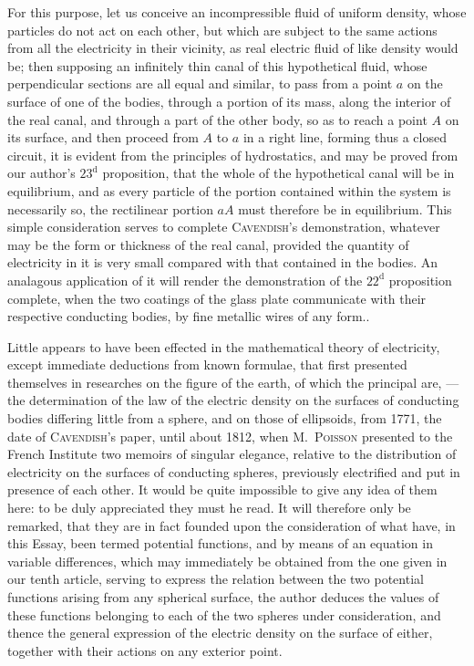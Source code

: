 \documentclass[12pt,notitlepage]{amsart}
\let\Person\textsc
\begin{document}
{For this purpose, let us conceive an incompressible
fluid of uniform density, whose
particles do not act on each other,
but which are subject to the same actions from all
the electricity in their vicinity, as real electric
fluid of like density would be; then supposing an
infinitely thin canal of this hypothetical fluid,
whose perpendicular sections are
all equal and similar, to pass from a point $a$
on the surface of one of the bodies, through
a portion of its mass, along the interior of the real canal,
and through a part of the
other body, so as to reach a point $A$ on its surface,
and then proceed from $A$ to $a$ in
a right line, forming thus a closed circuit,
it is evident from the principles of hydrostatics,
and may be proved from our author's $23^\text{d}$ proposition,
that the whole of the
hypothetical canal will be in equilibrium,
and as every particle of the portion contained
within the system is necessarily so,
the rectilinear portion $aA$ must therefore be in equilibrium.
This simple consideration serves to complete
\Person{Cavendish}'s demonstration,
whatever may be the form or thickness of the real canal,
provided the quantity of electricity
in it is very small compared with that contained in the bodies.
An analagous application
of it will render the demonstration of the $22^\text{d}$
proposition complete, when the two coatings
of the glass plate communicate with their respective conducting bodies,
by fine metallic wires of any form.}.

Little appears to have been effected in the mathematical theory of electricity,
except immediate deductions from known formulae, that first presented
themselves in researches on the figure of the earth, of which the principal
are, --- the determination of the law of the electric density on the surfaces of
conducting bodies differing little from a sphere, and on those of ellipsoids,
from 1771, the date of \Person{Cavendish}'s paper,
until about 1812, when M.~\Person{Poisson}
presented to the French Institute two memoirs of singular elegance, relative
to the distribution of electricity on the surfaces of conducting spheres, 
previously electrified and put in presence of each other. It would be quite 
impossible to give any idea of them here: to be duly appreciated they must he
read. It will therefore only be remarked, that they are in fact founded upon
the consideration of what have, in this Essay, been termed potential functions,
and by means of an equation in variable differences, which may immediately
be obtained from the one given in our tenth article, serving to express the
relation between the two potential functions arising from any spherical 
surface, the author deduces the values of these functions belonging to each of
the two spheres under consideration, and thence the general expression of the
electric density on the surface of either, together with their actions on any
exterior point.
\end{document}
